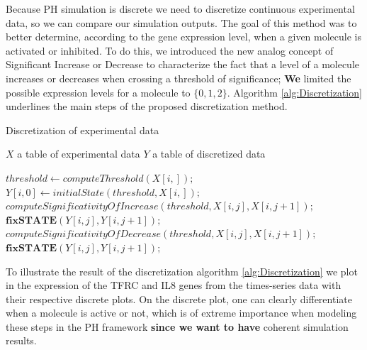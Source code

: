 \documentclass[11pt,a4paper,twoside]{epig}
\begin{document}
Because PH simulation is discrete we need to discretize continuous experimental data, so we can compare our simulation outputs.
The goal of this method was to better determine, according to the gene expression level, when  a given molecule is activated or inhibited.
To do this, we introduced the new analog concept of Significant Increase or Decrease to characterize the fact that a level of a molecule 
increases or decreases when crossing a threshold of significance; \textbf{We} limited the possible expression levels for a molecule to
$\{0, 1, 2\}$. Algorithm \ref{alg:Discretization} underlines the main steps of the proposed discretization method.
\begin{algorithm}
\caption{Discretization of experimental data}
\label{alg:Discretization}
\begin{algorithmic}
\REQUIRE $X$ a table of experimental data
\ENSURE $Y$ a table of discretized data

\STATE $threshold \leftarrow computeThreshold(X[i,]);$
\STATE $Y[i,0] \leftarrow initialState(threshold,X[i,]);$
   \STATE $computeSignificativityOfIncrease(threshold,X[i,j],X[i,j+1]);$
   \STATE $\textbf{fixSTATE}(Y[i,j],Y[i,j+1]);$
  \ELSE
   \STATE $computeSignificativityOfDecrease(threshold,X[i,j],X[i,j+1]);$
   \STATE $\textbf{fixSTATE}(Y[i,j],Y[i,j+1]);$
  \ENDIF
\ENDFOR

\ENDFOR

\end{algorithmic}
\end{algorithm}

To illustrate the result of the discretization algorithm \ref{alg:Discretization} we plot in  the expression 
of the TFRC and IL8 genes from the times-series data with their respective discrete plots. 
On the discrete plot, one can clearly differentiate when a molecule is active or not, which is of extreme importance 
when modeling these steps in the PH framework \textbf{since we want to have} coherent simulation results.
\end{document}
